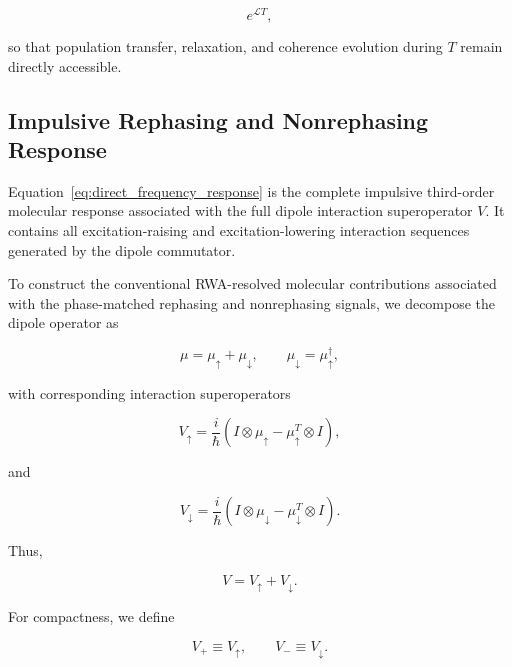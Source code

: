 \documentclass[11pt]{article}
\begin{document}
\begin{equation}
e^{\mathcal{L}T},
\end{equation}

so that population transfer, relaxation, and coherence evolution during
$T$ remain directly accessible.


\subsection{Impulsive Rephasing and Nonrephasing Response}
\label{subsec:impulsive_rnr}

Equation~\eqref{eq:direct_frequency_response} is the complete
impulsive third-order molecular response associated with the full
dipole interaction superoperator $V$. It contains all
excitation-raising and excitation-lowering interaction sequences
generated by the dipole commutator.

To construct the conventional RWA-resolved molecular contributions
associated with the phase-matched rephasing and nonrephasing signals,
we decompose the dipole operator as

\begin{equation}
\mu
=
\mu_{\uparrow}
+
\mu_{\downarrow},
\qquad
\mu_{\downarrow}
=
\mu_{\uparrow}^{\dagger},
\end{equation}

with corresponding interaction superoperators

\begin{equation}
V_{\uparrow}
=
\frac{i}{\hbar}
\left(
I\otimes\mu_{\uparrow}
-
\mu_{\uparrow}^{T}\otimes I
\right),
\end{equation}

and

\begin{equation}
V_{\downarrow}
=
\frac{i}{\hbar}
\left(
I\otimes\mu_{\downarrow}
-
\mu_{\downarrow}^{T}\otimes I
\right).
\end{equation}

Thus,

\begin{equation}
V
=
V_{\uparrow}
+
V_{\downarrow}.
\end{equation}

For compactness, we define

\begin{equation}
V_{+}\equiv V_{\uparrow},
\qquad
V_{-}\equiv V_{\downarrow}.
\end{equation}
\end{document}
